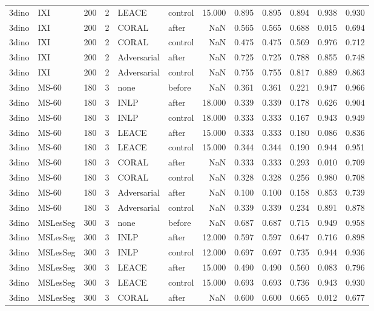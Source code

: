 \begin{tabular}{llrrllrrrrrr}
3dino & IXI & 200 & 2 & LEACE & control & 15.000 & 0.895 & 0.895 & 0.894 & 0.938 & 0.930 \\
3dino & IXI & 200 & 2 & CORAL & after & NaN & 0.565 & 0.565 & 0.688 & 0.015 & 0.694 \\
3dino & IXI & 200 & 2 & CORAL & control & NaN & 0.475 & 0.475 & 0.569 & 0.976 & 0.712 \\
3dino & IXI & 200 & 2 & Adversarial & after & NaN & 0.725 & 0.725 & 0.788 & 0.855 & 0.748 \\
3dino & IXI & 200 & 2 & Adversarial & control & NaN & 0.755 & 0.755 & 0.817 & 0.889 & 0.863 \\
3dino & MS-60 & 180 & 3 & none & before & NaN & 0.361 & 0.361 & 0.221 & 0.947 & 0.966 \\
3dino & MS-60 & 180 & 3 & INLP & after & 18.000 & 0.339 & 0.339 & 0.178 & 0.626 & 0.904 \\
3dino & MS-60 & 180 & 3 & INLP & control & 18.000 & 0.333 & 0.333 & 0.167 & 0.943 & 0.949 \\
3dino & MS-60 & 180 & 3 & LEACE & after & 15.000 & 0.333 & 0.333 & 0.180 & 0.086 & 0.836 \\
3dino & MS-60 & 180 & 3 & LEACE & control & 15.000 & 0.344 & 0.344 & 0.190 & 0.944 & 0.951 \\
3dino & MS-60 & 180 & 3 & CORAL & after & NaN & 0.333 & 0.333 & 0.293 & 0.010 & 0.709 \\
3dino & MS-60 & 180 & 3 & CORAL & control & NaN & 0.328 & 0.328 & 0.256 & 0.980 & 0.708 \\
3dino & MS-60 & 180 & 3 & Adversarial & after & NaN & 0.100 & 0.100 & 0.158 & 0.853 & 0.739 \\
3dino & MS-60 & 180 & 3 & Adversarial & control & NaN & 0.339 & 0.339 & 0.234 & 0.891 & 0.878 \\
3dino & MSLesSeg & 300 & 3 & none & before & NaN & 0.687 & 0.687 & 0.715 & 0.949 & 0.958 \\
3dino & MSLesSeg & 300 & 3 & INLP & after & 12.000 & 0.597 & 0.597 & 0.647 & 0.716 & 0.898 \\
3dino & MSLesSeg & 300 & 3 & INLP & control & 12.000 & 0.697 & 0.697 & 0.735 & 0.944 & 0.936 \\
3dino & MSLesSeg & 300 & 3 & LEACE & after & 15.000 & 0.490 & 0.490 & 0.560 & 0.083 & 0.796 \\
3dino & MSLesSeg & 300 & 3 & LEACE & control & 15.000 & 0.693 & 0.693 & 0.736 & 0.943 & 0.930 \\
3dino & MSLesSeg & 300 & 3 & CORAL & after & NaN & 0.600 & 0.600 & 0.665 & 0.012 & 0.677 \\

\end{tabular}
